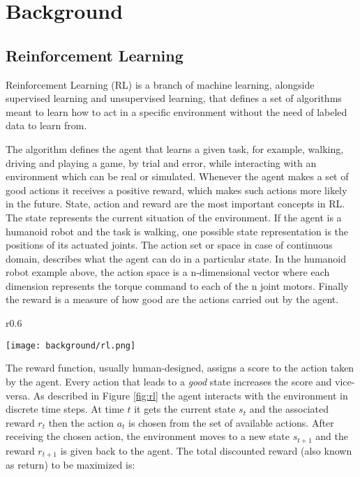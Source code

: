 \chapter{Background}

\section{Reinforcement Learning}

Reinforcement Learning (RL) is a branch of machine learning, alongside supervised learning and unsupervised learning, that defines a set of algorithms meant to learn how to act in a specific environment without the need of labeled data to learn from. 

The algorithm defines the agent that learns a given task, for example, walking, driving and playing a game, by trial and error, while interacting with an environment which can be real or simulated. Whenever the agent makes a set of good actions it receives a positive reward, which makes such actions more likely in the future. State, action and reward are the most important concepts in RL. The state represents the current situation of the environment. If the agent is a humanoid robot and the task is walking, one possible state representation is the positions of its actuated joints. The action set or space in case of continuous domain, describes what the agent can do in a particular state. In the humanoid robot example above, the action space is a n-dimensional vector where each dimension represents the torque command to each of the n joint motors. Finally the reward is a measure of how good are the actions carried out by the agent. 

\begin{wrapfigure}{r}{0.6\textwidth}
  \begin{center}
    \texttt{[image: background/rl.png]}
  \end{center}
  \caption{Basic reinforcement learning}
  \label{fig:rl}
\end{wrapfigure}

The reward function, usually human-designed, assigns a score to the action taken by the agent. Every action that leads to a \textit{good} state increases the score and vice-versa. As described in Figure \ref{fig:rl} the agent interacts with the environment in discrete time steps. At time $t$ it gets the current state $s_{t}$ and the associated reward $r_{t}$ then the action $a_{t}$ is chosen from the set of available actions. After receiving the chosen action, the environment moves to a new state $s_{t+1}$ and the reward $r_{t+1}$ is given back to the agent. The total discounted reward (also known as return) to be maximized is:


